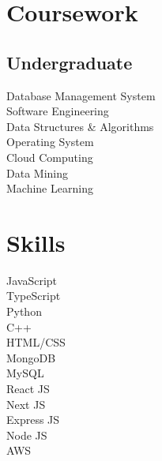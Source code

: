 \documentclass[]{deedy-resume-openfont}
\begin{document}
\begin{minipage}[t]{0.33\textwidth}

\section{Coursework}
\subsection{Undergraduate}
Database Management System \\
Software Engineering \\
Data Structures \& Algorithms \\
Operating System \\
Cloud Computing \\
Data Mining \\
Machine Learning \\
\sectionsep


\section{Skills}
\textbullet{} JavaScript \\ \textbullet{}  TypeScript \\ \textbullet{} Python \\ \textbullet{} C++ \\ \textbullet{} HTML/CSS \\ \textbullet{} MongoDB \\ \textbullet{} MySQL \\ \textbullet{} React JS \\ \textbullet{} Next JS \\ \textbullet{} Express JS \\ \textbullet{} Node JS \\ \textbullet{} AWS \\
\sectionsep

%
%

\end{minipage} 
\hfill
\end{document}
